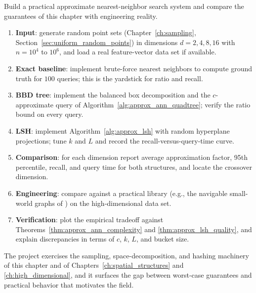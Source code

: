 Build a practical approximate nearest-neighbor search system and compare the
guarantees of this chapter with engineering reality.
\begin{enumerate}
  \item \textbf{Input}: generate random point sets
    (Chapter~\ref{ch:sampling}, Section~\ref{sec:uniform_random_points}) in
    dimensions $d = 2, 4, 8, 16$ with $n = 10^4$ to $10^6$, and load a real
    feature-vector data set if available.
  \item \textbf{Exact baseline}: implement brute-force nearest neighbors to
    compute ground truth for $100$ queries; this is the yardstick for ratio
    and recall.
  \item \textbf{BBD tree}: implement the balanced box decomposition and the
    $c$-approximate query of Algorithm~\ref{alg:approx_ann_quadtree}; verify
    the ratio bound on every query.
  \item \textbf{LSH}: implement Algorithm~\ref{alg:approx_lsh} with random
    hyperplane projections; tune $k$ and $L$ and record the
    recall-versus-query-time curve.
  \item \textbf{Comparison}: for each dimension report average
    approximation factor, 95th percentile, recall, and query time for both
    structures, and locate the crossover dimension.
  \item \textbf{Engineering}: compare against a practical library (e.g.,
    the navigable small-world graphs of \cite{malkov2018}) on the
    high-dimensional data set.
  \item \textbf{Verification}: plot the empirical tradeoff against
    Theorems~\ref{thm:approx_ann_complexity} and \ref{thm:approx_lsh_quality},
    and explain discrepancies in terms of $c$, $k$, $L$, and bucket size.
\end{enumerate}
The project exercises the sampling, space-decomposition, and hashing
machinery of this chapter and of Chapters~\ref{ch:spatial_structures} and
\ref{ch:high_dimensional}, and it surfaces the gap between worst-case
guarantees and practical behavior that motivates the field.
